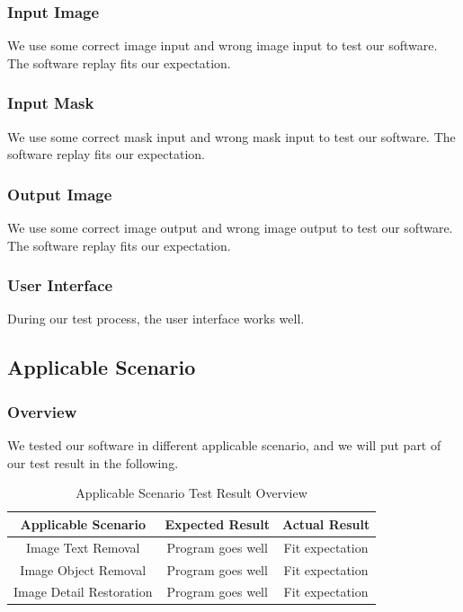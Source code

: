 \documentclass[12pt]{article}
\begin{document}
\subsubsection*{Input Image}
\qquad We use some correct image input and wrong image input to test our software. The software replay fits our expectation. 
\subsubsection*{Input Mask}
\qquad We use some correct mask input and wrong mask input to test our software. The software replay fits our expectation. 
\subsubsection*{Output Image}
\qquad We use some correct image output and wrong image output to test our software. The software replay fits our expectation. 
\subsubsection*{User Interface} 
\qquad During our test process, the user interface works well.

\subsection{Applicable Scenario}
\subsubsection*{Overview}
\qquad We tested our software in different applicable scenario, and we will put part of our test result in the following.
\begin{table}[H]
	\centering
	\begin{tabular}{|c|c|c|}
		\hline
		Applicable Scenario & Expected Result& Actual Result\\
		\hline
		Image Text Removal & Program goes well& Fit expectation\\
		\hline
		Image Object Removal & Program goes well& Fit expectation\\
		\hline
		Image Detail Restoration  & Program goes well& Fit expectation\\
		\hline
	\end{tabular}
	\caption{Applicable Scenario Test Result Overview}
\end{table}
\end{document}
